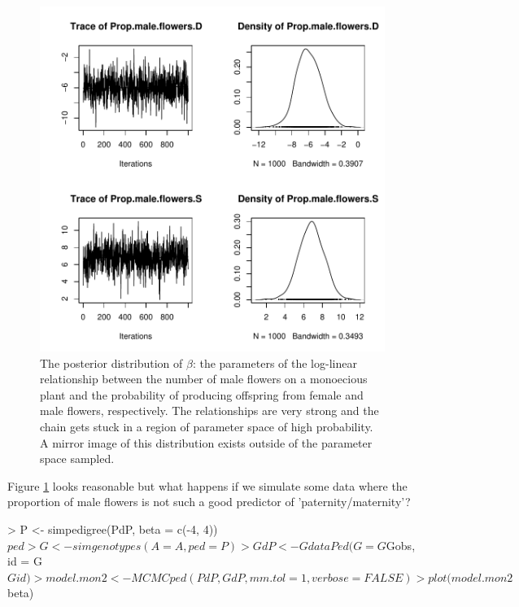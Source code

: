 \documentclass{article}
\begin{document}
\begin{figure}[!h]
\begin{center}
\includegraphics{Tutorial-096}
\end{center}
\caption{The posterior distribution of $\beta$: the parameters of the log-linear relationship between the number of male flowers on a monoecious plant and the probability of producing offspring from female and male flowers, respectively. The relationships are very strong and the chain gets stuck in a region of parameter space of high probability.  A mirror image of this distribution exists outside of the parameter space sampled.}
\label{mon1-fig}
\end{figure}


Figure \ref{mon1-fig} looks reasonable but what happens if we simulate some data where the proportion of male flowers is not such a good predictor of 'paternity/maternity'?  

\begin{Schunk}
\begin{Sinput}
> P <- simpedigree(PdP, beta = c(-4, 4))$ped
> G <- simgenotypes(A = A, ped = P)
> GdP <- GdataPed(G = G$Gobs, id = G$Gid)
> model.mon2 <- MCMCped(PdP, GdP, mm.tol = 1, verbose = FALSE)
> plot(model.mon2$beta)
\end{Sinput}
\end{Schunk}
\end{document}
